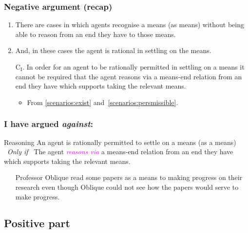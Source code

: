 \documentclass[noamssymb, compress, handout]{beamer} %
\newcommand{\hand}{\ding{43}}
\begin{document}
\begin{frame}
  \frametitle{Negative argument (recap)}

  \begin{enumerate}
  \item\label{scenarios:exist} There are cases in which agents recognise a means (as means) without being able to reason from an end they have to those means.
  \item\label{scenarios:persmissible} And, in these cases the agent is rational in settling on the means.

  \item[C\(_{\text{I}}\).]\label{scenario:no-reasoning} In order for an agent to be rationally permitted in settling on a means it cannot be required that the agent reasons via a means-end relation from an end they have which supports taking the relevant means.

  \begin{itemize}
  \item From \ref{scenarios:exist} and~\ref{scenarios:persmissible}.
  \end{itemize}
  \end{enumerate}
\end{frame}

\begin{frame}
  \frametitle{I have argued \emph{against}:}

  \begin{block}{Reasoning}
    An agent is rationally permitted to settle on a means (as a means)
    \newline
    \mbox{ }\hfill\emph{Only if}\hfill\mbox{ }
    \newline
    The agent \textcolor{fuchsia}{\emph{reasons via}} a means-end relation from an end they have which supports taking the relevant means.
  \end{block}

  \begin{itemize}
  \item[\hand] Professor Oblique read some papers as a means to making progress on their research even though Oblique could not see how the papers would serve to make progress.
  \end{itemize}
\end{frame}



\subsection{Positive part}
\label{sec:positive}
\end{document}
